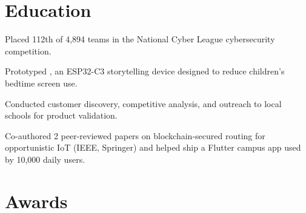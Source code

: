 \documentclass{fonts}
\begin{document}
\section{Education}
\begin{tightemize}
    \item Placed 112th of 4,894 teams in the National Cyber League cybersecurity competition.
\end{tightemize}

\begin{tightemize}
    \item Prototyped , an ESP32-C3 storytelling device designed to reduce children's bedtime screen use.
    \item Conducted customer discovery, competitive analysis, and outreach to local schools for product validation.
\end{tightemize}

\begin{tightemize}
    \item Co-authored 2 peer-reviewed papers on blockchain-secured routing for opportunistic IoT (IEEE, Springer) and helped ship a Flutter campus app used by 10,000 daily users.
\end{tightemize}


\section{Awards}
\textbf{}
\end{document}
